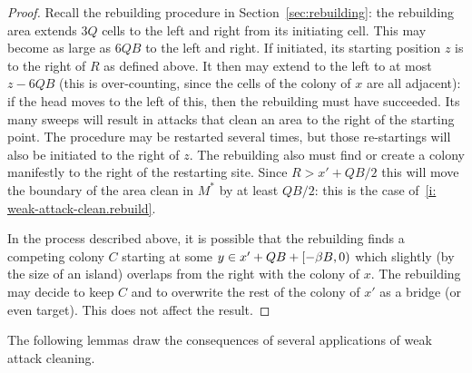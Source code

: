 \documentclass[11pt]{memoir}
\theoremstyle{definition} %
\def\B{B}
\newcommand{\Q}{Q} %
\begin{document}
\begin{proof}
Recall the rebuilding procedure in Section~\ref{sec:rebuilding}:
the rebuilding area extends \( 3\Q \) cells to the left and right from its initiating cell.
This may become as large as \( 6\Q\B \) to the left and right.
If initiated, its starting position \( z \) is to the right of \( R \) as defined above.
It then may extend to the left to at most \( z-6\Q\B \) (this is over-counting,
since the cells of the colony of \( x \) are all adjacent):
if the head moves to the left of this, then the rebuilding must have succeeded.
Its many sweeps will result in attacks that clean an area to the right of the starting point.
The procedure may be restarted several times, but those re-startings will also be initiated
to the right of \( z \).
The rebuilding also must find or create a colony manifestly to the right of the restarting site.
Since \( R>x'+\Q\B/2 \) this will move the boundary of the area clean in \( M^{*} \) 
by at least \( \Q\B/2 \): this is the case of~\eqref{i: weak-attack-clean.rebuild}.

In the process described above,
it is possible that the rebuilding finds a competing colony \( C \)
starting at some \( y \in x'+\Q\B + \lint{-\beta\B}{0}\) which
slightly (by the size of an island) overlaps from the right with the colony of \( x \).
The rebuilding may decide to keep \( C \) and to overwrite the rest of the colony of \( x' \) as a bridge
(or even target).
This does not affect the result.
\end{proof}

The following lemmas draw the consequences of several applications of weak attack cleaning.
\end{document}
